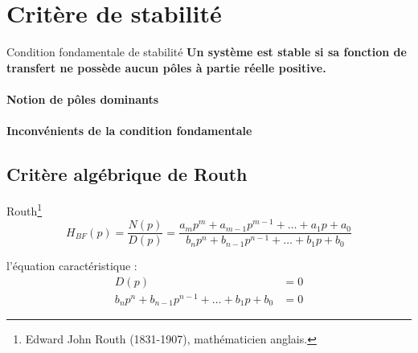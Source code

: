 \section{Critère de stabilité}

\begin{criteria}{Condition fondamentale de stabilité}
    \textbf{Un système est stable si sa fonction de transfert ne possède aucun pôles à partie réelle positive.}
\end{criteria}



\paragraph{Notion de pôles dominants}

\paragraph{Inconvénients de la condition fondamentale}

\subsection{Critère algébrique de Routh}

Routh\footnote{Edward John Routh (1831-1907), mathématicien anglais.}
$$
H_{BF}(p)=\dfrac{N(p)}{D(p)}=\dfrac{a_mp^m+a_{m-1}p^{m-1}+\ldots+a_1p+a_0}{b_np^n+b_{n-1}p^{n-1}+\ldots+b_1p+b_0}
$$

l'équation caractéristique :
\begin{align}
    D(p)&=0 \nonumber\\
    b_np^n+b_{n-1}p^{n-1}+\ldots+b_1p+b_0 &= 0
\end{align}

